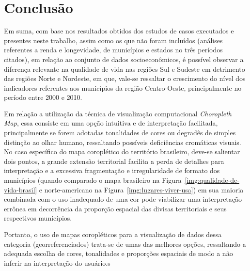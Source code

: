 \documentclass[conference]{IEEEtran}
\begin{document}
\section{Conclusão}
\label{section:conclusao}
Em suma, com base nos resultados obtidos dos estudos de casos executados e presentes neste trabalho, assim como os que não foram incluídos (análises referentes a renda e longevidade, de municípios e estados no três períodos citados), em relação ao conjunto de dados socioeconômicos, é possível observar a diferença relevante na qualidade de vida nas regiões Sul e Sudeste em detrimento das regiões Norte e Nordeste, em que, vale-se ressaltar o crescimento do nível dos indicadores referentes aos municípios da região Centro-Oeste, principalmente no período entre 2000 e 2010.

Em relação a utilização da técnica de visualização computacional \textit{Choropleth Map}, essa consiste em uma opção intuitiva e de interpretação facilitada, principalmente se forem adotadas tonalidades de cores ou degradês de simples distinção ao olhar humano, ressaltando possíveis deficiências cromáticas visuais. No caso específico do mapa coroplético do território brasileiro, deve-se salientar dois pontos, a grande extensão territorial facilita a perda de detalhes para interpretação e a excessiva fragmentação e irregularidade de formato dos municípios (quando comparado o mapa brasileiro na Figura~\ref{img:qualidade-de-vida-brasil} e norte-americano na Figura~\ref{img:lugares-viver-usa}) em sua maioria combinada com o uso inadequado de uma cor pode viabilizar uma interpretação errônea em decorrência da proporção espacial das divisas territoriais e seus respectivos municípios.

Portanto, o uso de mapas coropléticos para a visualização de dados dessa categoria (georreferenciados) trata-se de umas das melhores opções, ressaltando a adequada escolha de cores, tonalidades e proporções espaciais de modo a não inferir na interpretação do usuário.s
\end{document}
